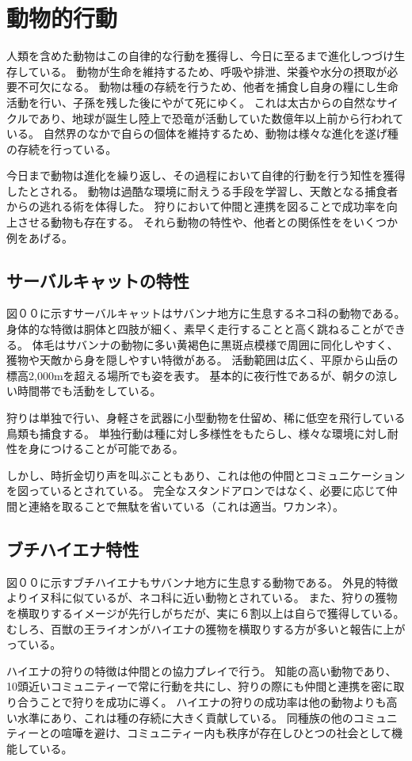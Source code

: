 \section{動物的行動}
人類を含めた動物はこの自律的な行動を獲得し、今日に至るまで進化しつづけ生存している。
動物が生命を維持するため、呼吸や排泄、栄養や水分の摂取が必要不可欠になる。
動物は種の存続を行うため、他者を捕食し自身の糧にし生命活動を行い、子孫を残した後にやがて死にゆく。
これは太古からの自然なサイクルであり、地球が誕生し陸上で恐竜が活動していた数億年以上前から行われている。
自然界のなかで自らの個体を維持するため、動物は様々な進化を遂げ種の存続を行っている。
\par 今日まで動物は進化を繰り返し、その過程において自律的行動を行う知性を獲得したとされる。
動物は過酷な環境に耐えうる手段を学習し、天敵となる捕食者からの逃れる術を体得した。
狩りにおいて仲間と連携を図ることで成功率を向上させる動物も存在する。
それら動物の特性や、他者との関係性ををいくつか例をあげる。
\subsection{サーバルキャットの特性}
図００に示すサーバルキャットはサバンナ地方に生息するネコ科の動物である。
身体的な特徴は胴体と四肢が細く、素早く走行することと高く跳ねることができる。
体毛はサバンナの動物に多い黄褐色に黒斑点模様で周囲に同化しやすく、獲物や天敵から身を隠しやすい特徴がある。
活動範囲は広く、平原から山岳の標高2,000mを超える場所でも姿を表す。
基本的に夜行性であるが、朝夕の涼しい時間帯でも活動をしている。
\par 狩りは単独で行い、身軽さを武器に小型動物を仕留め、稀に低空を飛行している鳥類も捕食する。
単独行動は種に対し多様性をもたらし、様々な環境に対し耐性を身につけることが可能である。
\par しかし、時折金切り声を叫ぶこともあり、これは他の仲間とコミュニケーションを図っているとされている。
完全なスタンドアロンではなく、必要に応じて仲間と連絡を取ることで無駄を省いている（これは適当。ワカンネ）。

\subsection{ブチハイエナ特性}
図００に示すブチハイエナもサバンナ地方に生息する動物である。
外見的特徴よりイヌ科に似ているが、ネコ科に近い動物とされている。
また、狩りの獲物を横取りするイメージが先行しがちだが、実に６割以上は自らで獲得している。
むしろ、百獣の王ライオンがハイエナの獲物を横取りする方が多いと報告に上がっている。
\par ハイエナの狩りの特徴は仲間との協力プレイで行う。
知能の高い動物であり、10頭近いコミュニティーで常に行動を共にし、狩りの際にも仲間と連携を密に取り合うことで狩りを成功に導く。
ハイエナの狩りの成功率は他の動物よりも高い水準にあり、これは種の存続に大きく貢献している。
同種族の他のコミュニティーとの喧嘩を避け、コミュニティー内も秩序が存在しひとつの社会として機能している。

